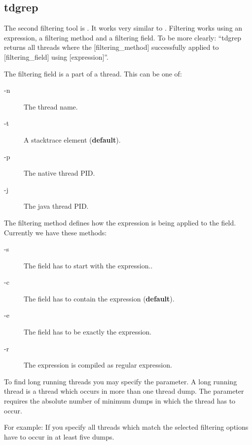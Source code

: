 \subsection{tdgrep}

The second filtering tool is .
It works very similar to .
Filtering works using an expression, a filtering method and a filtering field.
To be more clearly: ``tdgrep returns all threads where the [filtering\_method] successfully applied to [filtering\_field] using [expression]''.

The filtering field is a part of a thread.
This can be one of:
\begin{description}
\item[-n] The thread name.
\item[-t] A stacktrace element (\textbf{default}).
\item[-p] The native thread PID.
\item[-j] The java thread PID.
\end{description}

The filtering method defines how the expression is being applied to the field.
Currently we have these methods:
\begin{description}
\item[-s] The field has to start with the expression..
\item[-c] The field has to contain the expression (\textbf{default}).
\item[-e] The field has to be exactly the expression.
\item[-r] The expression is compiled as regular expression.
\end{description}

To find long running threads you may specify the  parameter.
A long running thread is a thread which occurs in more than one thread dump.
The parameter requires the absolute number of minimum dumps in which the thread has to occur.

For example: If you specify  all threads which match the selected
filtering options have to occur in at least five dumps.
